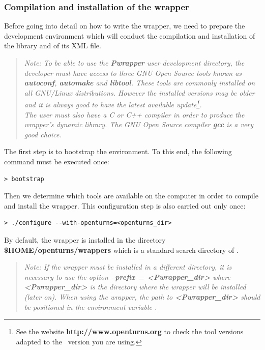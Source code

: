 \subsubsection{Compilation and installation of the wrapper}

Before going into detail on how to write the wrapper, we need to prepare the development environment which will conduct the compilation and installation of the library and of its XML file.

\small
\begin{quote}
  \textit{Note: To be able to use the {\bf Pwrapper} user development directory, the developer must have access to three GNU Open Source tools known as {\bf autoconf}, {\bf automake} and {\bf libtool}. These tools are commonly installed on all GNU/Linux distributions. However the installed versions may be older and it is always good to have the latest available update\footnote{See the website {\bf http://www.openturns.org} to check the tool versions adapted to the \OT\ version you are using.}.\\
    The user must also have a C or C++ compiler in order to produce the wrapper's dynamic library. The GNU Open Source compiler {\bf gcc} is a very good choice.}
\end{quote}
\normalsize

The first step is to bootstrap the environment. To this end, the following command must be executed once:

\lstset{language=Bash, basicstyle=\normalsize}
\begin{lstlisting}[frame=TBRL]
  > bootstrap
\end{lstlisting}

Then we determine which tools are available on the computer in order to compile and install the wrapper. This configuration step is also carried out only once:

\lstset{language=Bash, basicstyle=\normalsize}
\begin{lstlisting}[frame=TBRL]
  > ./configure --with-openturns=<openturns_dir>
\end{lstlisting}

By default, the wrapper is installed in the directory {\bf \$HOME/openturns/wrappers} which is a standard search directory of \OT.

\small
\begin{quote}
  \textit{Note: If the wrapper must be installed in a different directory, it is necessary to use the option {\bf --prefix = <Pwrapper\_dir>} where {\bf <Pwrapper\_dir>} is the directory where the wrapper will be installed (later on). When using the wrapper, the path to {\bf <Pwrapper\_dir>} should be positioned in the environment variable .}
\end{quote}
\normalsize

